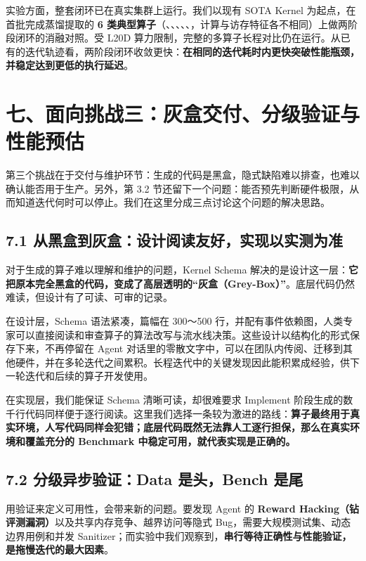 实验方面，整套闭环已在真实集群上运行。我们以现有 SOTA Kernel 为起点，在首批完成蒸馏提取的 \textbf{6 类典型算子}（、、、、、，计算与访存特征各不相同）上做两阶段闭环的消融对照。受 L20D 算力限制，完整的多算子长程对比仍在运行。从已有的迭代轨迹看，两阶段闭环收敛更快：\textbf{在相同的迭代耗时内更快突破性能瓶颈，并稳定达到更低的执行延迟}。


\SourceSeparator
\clearpage
\section{七、面向挑战三：灰盒交付、分级验证与性能预估}
第三个挑战在于交付与维护环节：生成的代码是黑盒，隐式缺陷难以排查，也难以确认能否用于生产。另外，第 3.2 节还留下一个问题：能否预先判断硬件极限，从而知道迭代何时可以停止。我们在这里分成三点讨论这个问题的解决思路。


\SourceSeparator
\subsection{7.1 从黑盒到灰盒：设计阅读友好，实现以实测为准}
对于生成的算子难以理解和维护的问题，Kernel Schema 解决的是设计这一层：\textbf{它把原本完全黑盒的代码，变成了高层透明的“灰盒（Grey-Box）”}。底层代码仍然难读，但设计有了可读、可审的记录。


在设计层，Schema 语法紧凑，篇幅在 300～500 行，并配有事件依赖图，人类专家可以直接阅读和审查算子的算法改写与流水线决策。这些设计以结构化的形式保存下来，不再停留在 Agent 对话里的零散文字中，可以在团队内传阅、迁移到其他硬件，并在多轮迭代之间累积。长程迭代中的关键发现因此能积累成经验，供下一轮迭代和后续的算子开发使用。


在实现层，我们能保证 Schema 清晰可读，却很难要求 Implement 阶段生成的数千行代码同样便于逐行阅读。这里我们选择一条较为激进的路线：\textbf{算子最终用于真实环境，人写代码同样会犯错；底层代码既然无法靠人工逐行担保，那么在真实环境和覆盖充分的 Benchmark 中稳定可用，就代表实现是正确的。}


\SourceSeparator
\subsection{7.2 分级异步验证：Data 是头，Bench 是尾}
用验证来定义可用性，会带来新的问题。要发现 Agent 的 \textbf{Reward Hacking（钻评测漏洞）}以及共享内存竞争、越界访问等隐式 Bug，需要大规模测试集、动态边界用例和并发 Sanitizer；而实验中我们观察到，\textbf{串行等待正确性与性能验证，是拖慢迭代的最大因素}。


